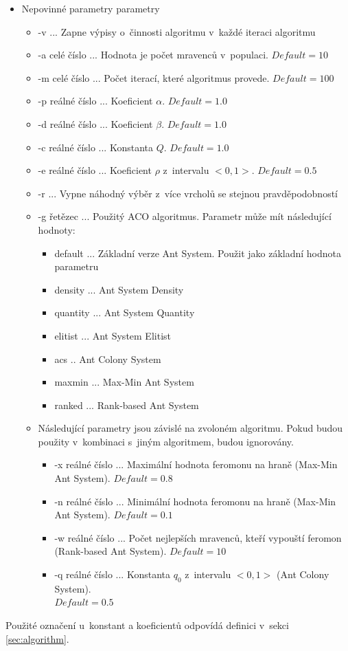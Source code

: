 \documentclass[a4paper, 12pt]{article}
\newcommand{\defVal}[1]{$Default=#1$}
\begin{document}
  \begin{itemize}
    \item Nepovinné parametry parametry
    \begin{itemize}
      \item -v ... Zapne výpisy o~činnosti algoritmu v~každé iteraci algoritmu
      \item -a celé číslo ... Hodnota je počet mravenců v~populaci. \defVal{10}
      \item -m celé číslo ... Počet iterací, které algoritmus provede. \defVal{100}
      \item -p reálné číslo ...  Koeficient $\alpha$. \defVal{1.0}
      \item -d reálné číslo ... Koeficient $\beta$. \defVal{1.0}
      \item -c reálné číslo ... Konstanta $Q$. \defVal{1.0}
      \item -e reálné číslo ... Koeficient $\rho$ z~intervalu $<0,1>$. \defVal{0.5}
      \item -r ... Vypne náhodný výběr z~více vrcholů se stejnou pravděpodobností
      \item -g řetězec ... Použitý ACO algoritmus. Parametr může mít následující hodnoty:
      \begin{itemize}
       \item default ... Základní verze Ant System. Použit jako základní hodnota parametru
       \item density ... Ant System Density
       \item quantity ... Ant System Quantity
       \item elitist ... Ant System Elitist
       \item acs .. Ant Colony System
       \item maxmin ... Max-Min Ant System
       \item ranked ... Rank-based Ant System
      \end{itemize}
      \item Následující parametry jsou závislé na zvoloném algoritmu. Pokud budou použity v~kombinaci s~jiným algoritmem, budou ignorovány.
      \begin{itemize}
        \item -x reálné číslo ... Maximální hodnota feromonu na hraně (Max-Min Ant System). \defVal{0.8}
        \item -n reálné číslo ... Minimální hodnota feromonu na hraně (Max-Min Ant System). \defVal{0.1}
        \item -w reálné číslo ... Počet nejlepších mravenců, kteří vypouští feromon (Rank-based Ant System). \defVal{10}
        \item -q reálné číslo ... Konstanta $q_0$ z~intervalu $<0,1>$ (Ant Colony System).\\\defVal{0.5}
      \end{itemize}
    \end{itemize}
  \end{itemize}
Použité označení u~konstant a koeficientů odpovídá definici v~sekci \ref{sec:algorithm}.
\end{document}
